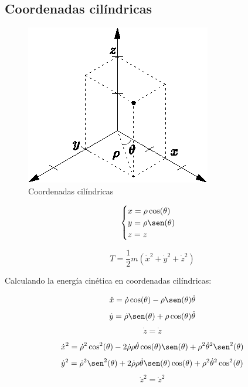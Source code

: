 \subsection{Coordenadas cilíndricas}

\begin{figure}[H]
    \centering
    \includegraphics[scale=1.5]{resources/figura_02.eps}
    \caption{Coordenadas cilíndricas}\label{figura_02}
\end{figure}

\begin{equation*}
    \begin{cases}
        x=\rho\cos(\theta)\\
        y=\rho\sen(\theta)\\
        z=z
    \end{cases}
\end{equation*}

\begin{equation*}
    T=\frac{1}{2}m(\dot{x}^2+\dot{y}^2+\dot{z}^2)
\end{equation*}

Calculando la energía cinética en coordenadas cilíndricas:

\begin{equation*}
    \dot{x}=\dot{\rho}\cos(\theta)-\rho\sen(\theta)\dot{\theta}
\end{equation*}
\begin{equation*}
    \dot{y}=\dot{\rho}\sen(\theta)+\rho\cos(\theta)\dot{\theta}
\end{equation*}
\begin{equation*}
    \dot{z}=\dot{z}
\end{equation*}

\begin{equation*}
    \dot{x}^2=\dot{\rho}^2\cos^2(\theta)-
    2\dot{\rho}\rho\dot{\theta}\cos(\theta)\sen(\theta)+
    \rho^2\dot{\theta}^2\sen^2(\theta)
\end{equation*}
\begin{equation*}
    \dot{y}^2=\dot{\rho}^2\sen^2(\theta)+
    2\dot{\rho}\rho\dot{\theta}\sen(\theta)\cos(\theta)+
    \rho^2\dot{\theta}^2\cos^2(\theta)
\end{equation*}
\begin{equation*}
    \dot{z}^2=\dot{z}^2
\end{equation*}

